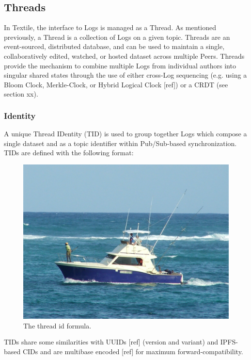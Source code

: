 \documentclass{comjnl}
\begin{document}
\subsection{Threads}

In Textile, the interface to Logs is managed as a Thread. As mentioned previously, a Thread is a collection of Logs on a given topic. Threads are an event-sourced, distributed database, and can be used to maintain a single, collaboratively edited, watched, or hosted dataset across multiple Peers. Threads provide the mechanism to combine multiple Logs from individual authors into singular shared states through the use of either cross-Log sequencing (e.g. using a Bloom Clock, Merkle-Clock, or Hybrid Logical Clock [ref]) or a CRDT (see section xx).

\subsubsection{Identity}

A unique Thread IDentity (TID) is used to group together Logs which compose a single dataset and as a topic identifier within Pub/Sub-based synchronization. TIDs are defined with the following format:

\begin{figure}
  \includegraphics[width=\linewidth]{boat.jpg}
  \caption{The thread id formula.}
  \label{fig:boat1}
\end{figure}

TIDs share some similarities with UUIDs [ref] (version and variant) and IPFS-based CIDs and are multibase encoded [ref] for maximum forward-compatibility.
\end{document}
